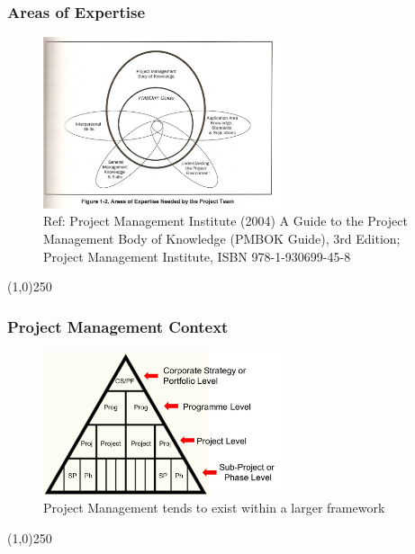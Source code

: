 \begin{frame}
\frametitle{Areas of Expertise}
 \begin{figure}
 	\centering
 		\includegraphics[width = 7cm]{images/Fig1-2old.jpg}
	\caption{Ref: Project Management Institute (2004) A Guide to the Project Management Body of Knowledge (PMBOK Guide), 3rd Edition; Project Management Institute, ISBN 978-1-930699-45-8}
 	\label{fig:1-2old}
 \end{figure}
\end{frame}
\begin{center}\line(1,0){250}\end{center}




\begin{frame}
\frametitle{Project Management Context}
 \begin{figure}
 	\centering
 		\includegraphics[width = 7cm]{images/context.jpg}
	\caption{Project Management tends to exist within a larger framework}
 	\label{fig:context}
 \end{figure}
\end{frame}
\begin{center}\line(1,0){250}\end{center}



